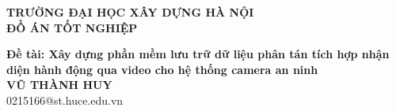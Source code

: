 \documentclass[main.tex]{subfiles}
\begin{document}
\begin{titlepage}
\thispagestyle{empty}
\begin{center}

{\textbf{\large{TRƯỜNG ĐẠI HỌC XÂY DỰNG HÀ NỘI}}}\\[4cm]

{\textbf{\huge{ĐỒ ÁN TỐT NGHIỆP}}}\\[1cm]
{\textbf{\Large{Đề tài: Xây dựng phần mềm lưu trữ dữ liệu phân tán tích hợp nhận diện hành động qua video cho hệ thống camera an ninh}}\\[1cm]


{\textbf{\large{VŨ THÀNH HUY}}}\\
{\large{0215166@st.huce.edu.vn}}\\[0.5cm]

\vspace{2cm}
\begin{table}[H]
\centering
{}
\end{table}}
\end{center}



\end{titlepage}
\end{document}
